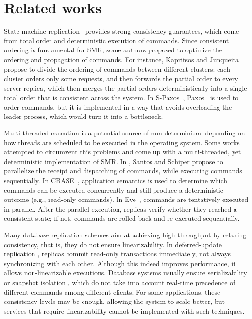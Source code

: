 \chapter[Related works]{Related works}
\label{sec:rw}

State machine replication~\cite{Kapritsos:2012um, kotla2004htbft, Lam78,
santos2013htsmr, Sch90} provides strong consistency guarantees, which come from
total order and deterministic execution of commands.
Since consistent ordering is fundamental for SMR, some authors proposed to
optimize the ordering and propagation of commands.
For instance, Kapritsos and Junqueira~\cite{kapritsos2010scalable} propose to
divide the ordering of commands between different clusters: each cluster orders
only some requests, and then forwards the partial order to every server replica,
which then merges the partial orders deterministically into a single total order
that is consistent across the system. In S-Paxos~\cite{biely2012spaxos},
Paxos~\cite{Lamport:1998ea} is used to order commands, but it is implemented in
a way that avoids overloading the leader process, which would turn it into a
bottleneck.

Multi-threaded execution is a potential source of non-determinism, depending on
how threads are scheduled to be executed in the operating system. Some works
attempted to circumvent this problems and come up with a multi-threaded, yet
deterministic implementation of SMR. In \cite{santos2013htsmr}, Santos and
Schiper propose to parallelize the receipt and dispatching of commands, while
executing commands sequentially. In CBASE~\cite{kotla2004htbft}, application
semantics is used to determine which commands can be executed concurrently and
still produce a deterministic outcome (e.g., read-only commands). In
Eve~\cite{Kapritsos:2012um}, commands are tentatively executed in parallel.
After the parallel execution, replicas verify whether they reached a consistent
state; if not, commands are rolled back and re-executed sequentially.

Many database replication schemes aim at achieving high throughput by relaxing
consistency, that is, they do not ensure linearizability. In deferred-update
replication \cite{chundi96dur, kobus2013hybrid, sciascia2012sdur, SousaOMP01},
replicas commit read-only transactions immediately, not always synchronizing
with each other. Although this indeed improves performance, it allows
non-linearizable executions. Database systems usually ensure serializability
\cite{BHG87} or snapshot isolation \cite{LinKJPA09}, which do not take into
account real-time precedence of different commands among different clients. For
some applications, these consistency levels may be enough, allowing the system
to scale better, but services that require linearizability cannot be implemented
with such techniques.

